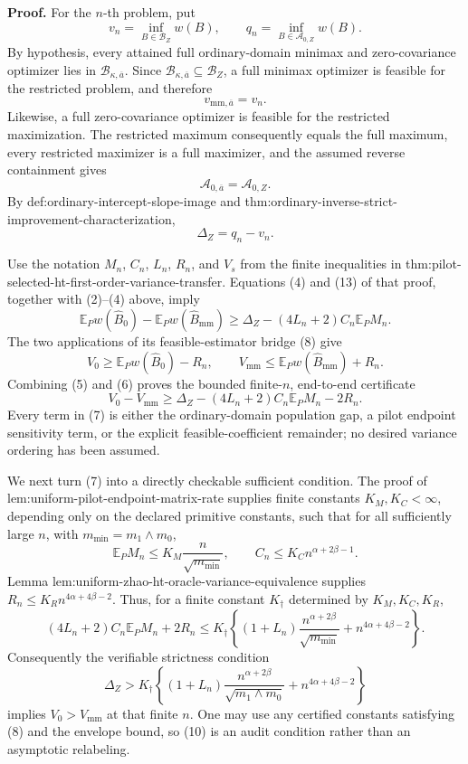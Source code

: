 \textbf{Proof.}
For the \(n\)-th problem, put
\[
 v_n=\inf_{B\in\mathcal B_Z}w(B),
 \qquad
 q_n=\inf_{B\in\mathcal A_{0,Z}}w(B).
 \tag{1}
\]
By hypothesis, every attained full ordinary-domain minimax and zero-covariance optimizer lies in \(\mathcal B_{\kappa,\overline a}\).  Since \(\mathcal B_{\kappa,\overline a}\subseteq\mathcal B_Z\), a full minimax optimizer is feasible for the restricted problem, and therefore
\[
 v_{\mathrm{mm},\overline a}=v_n.
 \tag{2}
\]
Likewise, a full zero-covariance optimizer is feasible for the restricted maximization.  The restricted maximum consequently equals the full maximum, every restricted maximizer is a full maximizer, and the assumed reverse containment gives
\[
 \mathcal A_{0,\overline a}=\mathcal A_{0,Z}.
 \tag{3}
\]
By def:ordinary-intercept-slope-image and thm:ordinary-inverse-strict-improvement-characterization,
\[
 \Delta_Z=q_n-v_n.
 \tag{4}
\]

Use the notation \(M_n\), \(C_n\), \(L_n\), \(R_n\), and \(V_s\) from the finite inequalities in thm:pilot-selected-ht-first-order-variance-transfer.  Equations (4) and (13) of that proof, together with (2)--(4) above, imply
\[
 \mathbb E_Pw(\widehat B_0)-\mathbb E_Pw(\widehat B_{\mathrm{mm}})
 \geq
 \Delta_Z-(4L_n+2)C_n\mathbb E_PM_n.
 \tag{5}
\]
The two applications of its feasible-estimator bridge (8) give
\[
 V_0\geq\mathbb E_Pw(\widehat B_0)-R_n,
 \qquad
 V_{\mathrm{mm}}\leq\mathbb E_Pw(\widehat B_{\mathrm{mm}})+R_n.
 \tag{6}
\]
Combining (5) and (6) proves the bounded finite-\(n\), end-to-end certificate
\[
 \boxed{
 V_0-V_{\mathrm{mm}}
 \geq
 \Delta_Z-(4L_n+2)C_n\mathbb E_PM_n-2R_n.}
 \tag{7}
\]
Every term in (7) is either the ordinary-domain population gap, a pilot endpoint sensitivity term, or the explicit feasible-coefficient remainder; no desired variance ordering has been assumed.

We next turn (7) into a directly checkable sufficient condition.  The proof of lem:uniform-pilot-endpoint-matrix-rate supplies finite constants \(K_M,K_C<\infty\), depending only on the declared primitive constants, such that for all sufficiently large \(n\), with \(m_{\min}=m_1\wedge m_0\),
\[
 \mathbb E_PM_n\leq K_M\frac{n}{\sqrt{m_{\min}}},
 \qquad
 C_n\leq K_Cn^{\alpha+2\beta-1}.
 \tag{8}
\]
Lemma lem:uniform-zhao-ht-oracle-variance-equivalence supplies \(R_n\leq K_Rn^{4\alpha+4\beta-2}\).  Thus, for a finite constant \(K_\dagger\) determined by \(K_M,K_C,K_R\),
\[
 (4L_n+2)C_n\mathbb E_PM_n+2R_n
 \leq K_\dagger\left\{
 (1+L_n)\frac{n^{\alpha+2\beta}}{\sqrt{m_{\min}}}
 +n^{4\alpha+4\beta-2}
 \right\}.
 \tag{9}
\]
Consequently the verifiable strictness condition
\[
 \Delta_Z>
 K_\dagger\left\{
 (1+L_n)\frac{n^{\alpha+2\beta}}{\sqrt{m_1\wedge m_0}}
 +n^{4\alpha+4\beta-2}
 \right\}
 \tag{10}
\]
implies \(V_0>V_{\mathrm{mm}}\) at that finite \(n\).  One may use any certified constants satisfying (8) and the envelope bound, so (10) is an audit condition rather than an asymptotic relabeling.

